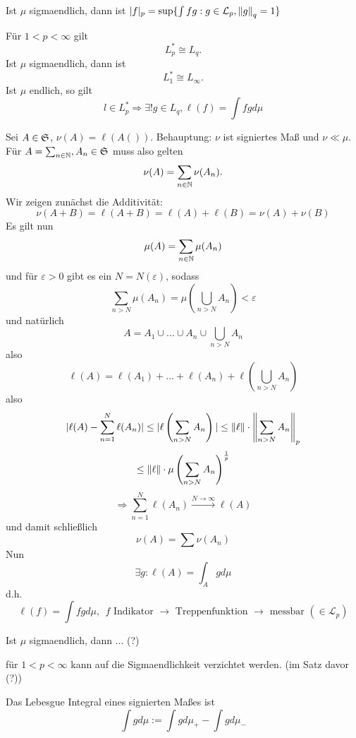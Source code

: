 	\begin{satz}
		Ist $\mu$ sigmaendlich, dann ist $|f|_p=\sup\{\int fg: g\in\mathcal{L}_p, \norm{g}_q=1\}$
	\end{satz}
	
	\begin{satz}
		Für $1<p<\infty$ gilt
		\[ L_p^*\cong L_q. \]
		Ist $\mu$ sigmaendlich, dann ist
		\[ L_1^*\cong L_\infty. \]
		Ist $\mu$ endlich, so gilt
		\[ l\in L_p^*\Rightarrow \exists! g\in L_q, \ell(f)=\int fgd\mu \]
	\end{satz}

	\begin{bew}
		Sei $A\in\S$, $\nu(A)=\ell(A())$. Behauptung: $\nu$ ist signiertes Maß und $\nu \ll \mu$. Für $A=\sum_{n\in\N}, A_n\in\S$ muss also gelten
		\[ \nu(A)=\sum_{n\in\N} \nu(A_n). \]
		Wir zeigen zunächst die Additivität:
		\[ \nu(A+B)=\ell(A+B)=\ell(A)+\ell(B)=\nu(A)+\nu(B) \]
		Es gilt nun
		\[ \mu(A)=\sum_{n\in\N} \mu(A_n) \]
		und für $\varepsilon>0$ gibt es ein $N=N(\varepsilon)$, sodass
		\[ \sum_{n>N}\mu(A_n)=\mu(\bigcup_{n>N}A_n)<\varepsilon \]
		und natürlich
		\[ A=A_1\cup ...\cup A_n\cup\bigcup_{n>N}A_n \]
		also 
		\[ \ell(A)=\ell(A_1)+...+\ell(A_n)+\ell\left(\bigcup_{n>N}A_n\right) \]
		also
		\[ |\ell(A)-\sum_{n=1}^N\ell(A_n)|\le|\ell\left(\sum_{n>N}A_n\right)|\le\norm{\ell}\cdot\norm{\sum_{n>N} A_n}_p \]
		\[ \le \norm{\ell}\cdot\mu\left(\sum_{n>N}A_n\right)^\frac{1}{p} \]
		\[ \Rightarrow \sum_{n=1}^N\ell(A_n)\stackrel{N\to\infty}{\longrightarrow}\ell(A) \]
		und damit schließlich
		\[ \nu(A)=\sum\nu(A_n) \]
		Nun
		\[ \exists g: \ell(A)=\int_A gd\mu \]
		d.h. 
		\[ \ell(f)=\int fgd\mu, \:\: f\text{ Indikator }\rightarrow \text{ Treppenfunktion }\rightarrow\text{ messbar }(\in\mathcal{L}_p) \]
	\end{bew}

	\begin{satz}
		Ist $\mu$ sigmaendlich, dann ... (?)
	\end{satz}

	\begin{satz}
		für $1<p<\infty$ kann auf die Sigmaendlichkeit verzichtet werden. (im Satz davor (?))
	\end{satz}
	
	\begin{defi}
		Das Lebesgue Integral eines signierten Maßes ist
		\[ \int gd\mu:=\int gd\mu_+-\int gd\mu_- \]
	\end{defi}
	
